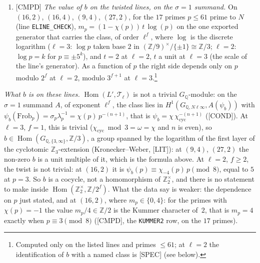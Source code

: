\documentclass[11pt]{article}
\newcommand{\Z}{\mathbb{Z}}
\newcommand{\Q}{\mathbb{Q}}
\newcommand{\code}[1]{\texttt{#1}}
\newcommand{\LIT}{\textsf{\small[LIT]}}
\newcommand{\CMPD}{\textsf{\small[CMPD]}}
\newcommand{\PGCOND}{\textsf{\small[COND]}}
\newcommand{\PGSPEC}{\textsf{\small[SPEC]}}
\newcommand{\Hom}{\operatorname{Hom}}
\begin{document}
\begin{enumerate}[leftmargin=1.8em,itemsep=2pt]
\item \CMPD{} \emph{The value of $b$ on the twisted lines, on the $\sigma=1$ summand.} On $(16,2)$, $(16,4)$, $(9,4)$, $(27,2)$, for the $17$ primes $p\le61$ prime to $N$ (line \code{ELINE\_CHECK}), $m_p=(1-\chi(p))\,t\,\log(p)$ on the one exported generator that carries the class, of order $\ell^{f}$, where $\log$ is the discrete logarithm ($\ell=3$: $\log p$ taken base $2$ in $(\Z/9)^{\times}/\{\pm1\}\cong\Z/3$; $\ell=2$: $\log p=k$ for $p\equiv\pm5^{k}$), and $t=2$ at $\ell=2$, $t$ a unit at $\ell=3$ (the scale of the line's generator). As a function of $p$ the right side depends only on $p$ modulo $2^{f}$ at $\ell=2$, modulo $3^{f+1}$ at $\ell=3$.\footnote{Computed only on the listed lines and primes $\le61$; at $\ell=2$ the identification of $b$ with a named class is \PGSPEC{} (see below).}
\end{enumerate}

\emph{What $b$ is on these lines.} $\Hom(L',\mathcal T_\ell)$ is not a trivial $G_\Q$-module: on the $\sigma=1$ summand $A$, of exponent $\ell^{f}$, the class lies in $H^{1}(G_{\Q,N\ell\infty},A(\psi_b))$ with $\psi_b(\mathrm{Frob}_p)=\sigma_p\lambda_p^{-1}=\chi(p)\,p^{-(n+1)}$, that is $\psi_b=\chi\,\chi_{\mathrm{cyc}}^{-(n+1)}$ (\PGCOND{}). At $\ell=3$, $f=1$, this is trivial ($\chi_{\mathrm{cyc}}\bmod3=\omega=\chi$ and $n$ is even), so $b\in\Hom(G_{\Q,\{3,\infty\}},\Z/3)$, a group spanned by the logarithm of the first layer of the cyclotomic $\Z_3$-extension (Kronecker--Weber, \LIT): at $(9,4)$, $(27,2)$ the non-zero $b$ is a unit multiple of it, which is the formula above. At $\ell=2$, $f\ge2$, the twist is not trivial: at $(16,2)$ it is $\psi_b(p)\equiv\chi_{-4}(p)\,p\pmod 8$, equal to $5$ at $p=3$. So $b$ is a cocycle, not a homomorphism of $\Z_2^{\times}$, and there is no statement to make inside $\Hom(\Z_2^{\times},\Z/2^{f})$. What the data say is weaker: the dependence on $p$ just stated, and at $(16,2)$, where $m_p\in\{0,4\}$: for the primes with $\chi(p)=-1$ the value $m_p/4\in\Z/2$ is the Kummer character of~$2$, that is $m_p=4$ exactly when $p\equiv3\pmod8$ (\CMPD, the \code{KUMMER2} row, on the $17$ primes).
\end{document}
